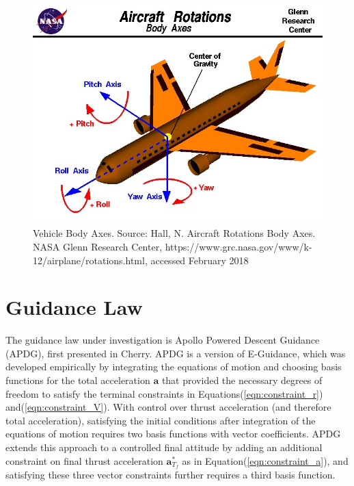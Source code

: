 \begin{figure}[H]
	\centering
	\begin{minipage}{4.3 in}
		\includegraphics[width=\linewidth]{Figures/bodyaxes.jpg}
		\caption{Vehicle Body Axes. Source: Hall, N. Aircraft Rotations Body Axes. NASA Glenn Research Center, https://www.grc.nasa.gov/www/k-12/airplane/rotations.html, accessed February 2018 \label{fig:bodyaxes} }
	\end{minipage}
\end{figure}

\section{Guidance Law} \label{sec:guidancelaw}
The guidance law under investigation is Apollo Powered Descent Guidance (APDG), first presented in Cherry\:\cite{CHERRY}. APDG is a version of E-Guidance, which was developed empirically by integrating the equations of motion and choosing basis functions for the total acceleration $\bm{a}$ that provided the necessary degrees of freedom to satisfy the terminal constraints in Equations\:(\ref{eqn:constraint_r}) and\:(\ref{eqn:constraint_V}). With control over thrust acceleration (and therefore total acceleration), satisfying the initial conditions after integration of the equations of motion requires two basis functions with vector coefficients. APDG extends this approach to a controlled final attitude by adding an additional constraint on final thrust acceleration $\bm{a}^*_{T_f}$ as in Equation\:(\ref{eqn:constraint_a}), and satisfying these three vector constraints further requires a third basis function. 

